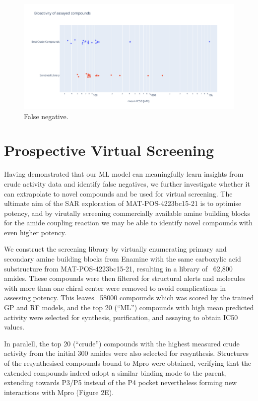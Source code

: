 
\begin{figure}
    \centering
    \includegraphics[width=\textwidth]{Chapters/Crude/Figs/strip_plot.pdf}
    \caption{False negative.}
    \label{fig:false_negative}
\end{figure}

\section{Prospective Virtual Screening}

Having demonstrated that our ML model can meaningfully learn insights from crude activity data and identify false negatives, we further investigate whether it can extrapolate to novel compounds and be used for virtual screening. The ultimate aim of the SAR exploration of MAT-POS-4223bc15-21 is to optimise potency, and by virutally screening commercially available amine building blocks for the amide coupling reaction we may be able to identify novel compounds with even higher potency.

We construct the screening library by virtually enumerating primary and secondary amine building blocks from Enamine with the same carboxylic acid substructure from MAT-POS-4223bc15-21, resulting in a library of ~62,800 amides. These compounds were then filtered for structural alerts and molecules with more than one chiral center were removed to avoid complications in assessing potency. This leaves ~58000 compounds which was scored by the trained GP and RF models, and the top 20 (``ML'') compounds with high mean predicted activity were selected for synthesis, purification, and assaying to obtain IC50 values.


In paralell, the top 20 (``crude'') compounds with the highest measured crude activity from the initial 300 amides were also selected for resynthesis. Structures of the resynthesised compounds bound to Mpro were obtained, verifying that the extended compounds indeed adopt a similar binding mode to the parent, extending towards P3/P5 instead of the P4 pocket nevertheless forming new interactions with Mpro (Figure 2E).

